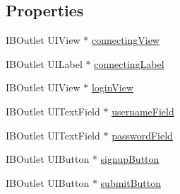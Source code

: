 \subsection*{Properties}
\begin{DoxyCompactItemize}
\item 
I\-B\-Outlet U\-I\-View $\ast$ \hyperlink{interface_w_user_login_view_controller_a7edf0dc88584cbbe8ef1731ba4530574}{connecting\-View}
\item 
I\-B\-Outlet U\-I\-Label $\ast$ \hyperlink{interface_w_user_login_view_controller_ab4b212619105e185df063076cd03b0f6}{connecting\-Label}
\item 
I\-B\-Outlet U\-I\-View $\ast$ \hyperlink{interface_w_user_login_view_controller_ac06163646bad6193da291bf0b2400e66}{login\-View}
\item 
I\-B\-Outlet U\-I\-Text\-Field $\ast$ \hyperlink{interface_w_user_login_view_controller_a5131df666139de3fe9e992cc0e7270d8}{username\-Field}
\item 
I\-B\-Outlet U\-I\-Text\-Field $\ast$ \hyperlink{interface_w_user_login_view_controller_a8427bd8d7bde24e7e3276896048515fb}{password\-Field}
\item 
I\-B\-Outlet U\-I\-Button $\ast$ \hyperlink{interface_w_user_login_view_controller_ab555305d77ce174db8384bad2737df40}{signup\-Button}
\item 
I\-B\-Outlet U\-I\-Button $\ast$ \hyperlink{interface_w_user_login_view_controller_a2a7c3d4b33a80b0297668180f3a70716}{submit\-Button}
\end{DoxyCompactItemize}


